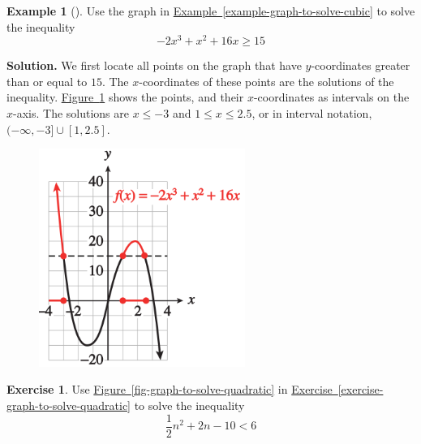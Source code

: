 \documentclass[10pt,]{book}
\theoremstyle{plain}
\theoremstyle{definition}
\newtheorem{exercise}[theorem]{Exercise}
\theoremstyle{definition}
\newtheorem{example}[theorem]{Example}
\numberwithin{equation}{section}
\newcommand{\lt}{ < }
\begin{document}
\begin{example}[]\label{example-graph-to-solve-cubic2}
Use the graph in \hyperref[example-graph-to-solve-cubic]{Example~\ref{example-graph-to-solve-cubic}}  to solve the inequality
    \begin{equation*}−2x^3 + x^2 + 16x \ge 15\end{equation*}%
\par\medskip\noindent%
\textbf{Solution.}\quad 
        We first locate all points on the graph that have \(y\)-coordinates greater than or equal to \(15\). The \(x\)-coordinates of these points are the solutions of the inequality. \hyperref[fig-graph-to-solve-cubic2]{Figure~\ref{fig-graph-to-solve-cubic2}} shows the points, and their \(x\)-coordinates as intervals on the \(x\)-axis. The solutions are \(x \le −3\) and \(1\le x \le 2.5\), or in interval notation, \((-∞, −3] ∪ [1, 2.5]\).
        \leavevmode%
\begin{figure}
\centering
\includegraphics[width=0.60\textwidth,]{images/fig-graph-to-solve-cubic2.svg}\caption{\label{fig-graph-to-solve-cubic2}}
\end{figure}
\end{example}
\begin{exercise}\label{exercise-graph-to-solve-quadratic2}
Use \hyperref[fig-graph-to-solve-quadratic]{Figure~\ref{fig-graph-to-solve-quadratic}} in \hyperref[exercise-graph-to-solve-quadratic]{Exercise~\ref{exercise-graph-to-solve-quadratic}} to solve the inequality
    \begin{equation*}\frac{1}{2}n^2 + 2n − 10 \lt 6\end{equation*}\end{exercise}
\typeout{************************************************}
\typeout{************************************************}
\end{document}

